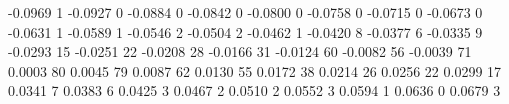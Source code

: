 -0.0969 1
-0.0927 0
-0.0884 0
-0.0842 0
-0.0800 0
-0.0758 0
-0.0715 0
-0.0673 0
-0.0631 1
-0.0589 1
-0.0546 2
-0.0504 2
-0.0462 1
-0.0420 8
-0.0377 6
-0.0335 9
-0.0293 15
-0.0251 22
-0.0208 28
-0.0166 31
-0.0124 60
-0.0082 56
-0.0039 71
0.0003 80
0.0045 79
0.0087 62
0.0130 55
0.0172 38
0.0214 26
0.0256 22
0.0299 17
0.0341 7
0.0383 6
0.0425 3
0.0467 2
0.0510 2
0.0552 3
0.0594 1
0.0636 0
0.0679 3
